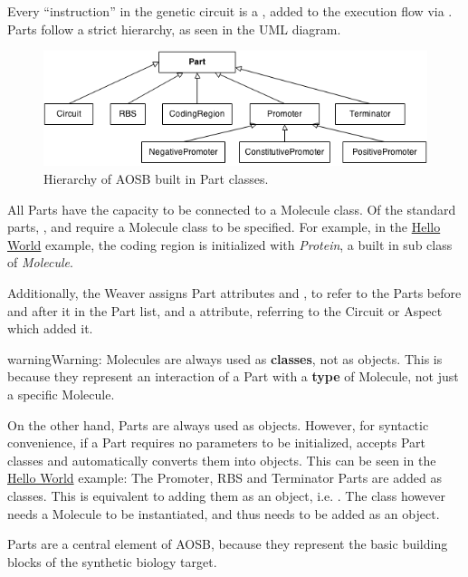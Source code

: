 \documentclass[letterpaper,10pt,english]{sphinxmanual}
\begin{document}
Every ``instruction'' in the genetic circuit is a , added to the execution flow via . Parts follow a strict hierarchy, as seen in the UML diagram.
\begin{figure}[htbp]
\centering
\capstart

\includegraphics{part_uml.png}
\caption{Hierarchy of AOSB built in Part classes.}\end{figure}

All Parts have the capacity to be connected to a Molecule class. Of the standard parts, ,  and  require a Molecule class to be specified. For example, in the {\hyperref[tutorial:hello-world]{Hello World}} example, the coding region is initialized with \emph{Protein}, a built in sub class of \emph{Molecule}.

Additionally, the Weaver assigns Part attributes  and , to refer to the Parts before and
after it in the Part list, and a  attribute, referring to the Circuit or Aspect which added it.

\begin{notice}{warning}{Warning:}
Molecules are always used as \textbf{classes}, not as objects. This is because they
represent an interaction of a Part with a \textbf{type} of Molecule, not just a specific
Molecule.

On the other hand, Parts are always used as objects. However, for syntactic
convenience, if a Part requires no parameters to be initialized, 
accepts Part classes and automatically converts them into objects. This can be seen
in the {\hyperref[tutorial:hello-world]{Hello World}} example: The Promoter, RBS and Terminator Parts are added
as classes. This is equivalent to adding them as an object, i.e.
. The  class however needs a Molecule to be
instantiated, and thus needs to be added as an object.
\end{notice}

Parts are a central element of AOSB, because they represent the basic building blocks of
the synthetic biology target.
\end{document}
